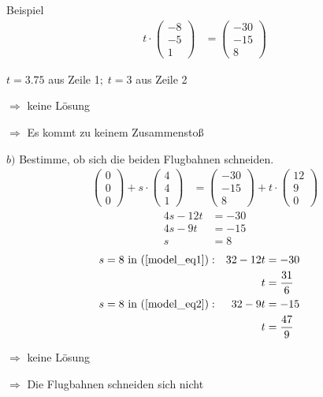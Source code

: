 \documentclass{article}
\begin{document}
\begin{boxx}[DarkBlue]{Beispiel}
\begin{align*}
            t \cdot \begin{pmatrix}-8\\-5\\1\end{pmatrix} &= \begin{pmatrix}-30\\-15\\8\end{pmatrix}
        \end{align*}
        \begin{center}
            $t=3.75$ aus Zeile 1$;\;t=3$ aus Zeile 2

            $\Rightarrow$ keine Lösung

            $\Rightarrow$ Es kommt zu keinem Zusammenstoß
        \end{center}
        $b)$\hspace{3mm} Bestimme, ob sich die beiden Flugbahnen schneiden.
        \begin{align*}
            \begin{pmatrix}0\\0\\0\end{pmatrix} + s \cdot \begin{pmatrix}4\\4\\1\end{pmatrix} &=  \begin{pmatrix}-30\\-15\\8\end{pmatrix} + t \cdot \begin{pmatrix}12\\9\\0\end{pmatrix}
        \end{align*}
        \begin{align}
            4s-12t &= -30 \label{model_eq1}\\
            4s-9t &= -15 \label{model_eq2}\\
            s &= 8 \label{model_eq3}
        \end{align}
        \begin{align*}
            &&&&&&& s = 8 \text{ in (\ref{model_eq1})}:& 32-12t &= -30 &&&&&&&&\\
            &&&&&&& & t &=\frac{31}{6} \\
            &&&&&&& s = 8 \text{ in (\ref{model_eq2})}:& 32-9t &= -15 \\
            &&&&&&& & t &=\frac{47}{9} 
        \end{align*}
        \begin{center}
            $\Rightarrow$ keine Lösung

            $\Rightarrow$ Die Flugbahnen schneiden sich nicht
        \end{center}
    \end{boxx}
    \newpage 
\end{document}
